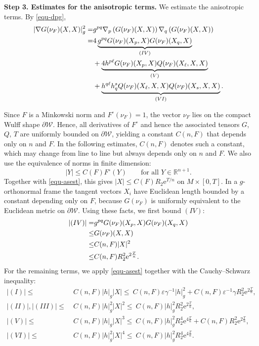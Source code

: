 \documentclass[11pt,reqno]{amsart}
\theoremstyle{definition}
\theoremstyle{remark}
\numberwithin{equation}{section}
\begin{document}
		\textbf{Step 3. Estimates for the anisotropic terms.}
		We estimate the anisotropic terms. By \eqref{equ-dpg},
		\begin{align}
			|\nabla G(\nu_F)(X,X)|_{g}^2
			=& g^{pq}\nabla_p\left( G(\nu_F)(X,X) \right) \nabla_q\left( G(\nu_F)(X,X) \right) \notag\\
			=&  4\underbrace{g^{pq}G(\nu_F)(X_p,X)G(\nu_F)(X_q,X)}_{(IV)} \nonumber\\
			&+ \underbrace{4h^{p\ell} G(\nu_F)(X_p,X) Q(\nu_F)(X_{\ell},X,X)}_{(V)} \notag\\
			& + \underbrace{h^{q\ell}h^s_q Q(\nu_F)(X_{\ell},X,X)Q(\nu_F)(X_s,X,X)}_{(VI)}.  \label{345}
		\end{align}
		
		Since $F$ is a Minkowski norm and $F^\circ(\nu_F)=1$, the vector $\nu_F$ lies on the compact Wulff shape $\partial\mathcal{W}$. Hence, all derivatives of $F^\circ$ and hence the associated tensors $G$, $Q$, $T$ are uniformly bounded on $\partial\mathcal{W}$, yielding a constant $C(n,F)$ that depends only on $n$ and $F$. In the following estimates, $C(n,F)$ denotes such a constant, which may change from line to line but always depends only on $n$ and $F$. We also use the equivalence of norms in finite dimension:
		\begin{equation*}
			|Y|\leq C(F)F^\circ(Y)\qquad\text{for all }Y\in\mathbb R^{n+1}.
		\end{equation*}
		Together with \eqref{equ-asest}, this gives $|X|\leq C(F)R_2\mathrm{e}^{T/n}$ on $M\times[0,T]$. In a $g$-orthonormal frame the tangent vectors $X_i$ have Euclidean length bounded by a constant depending only on $F$, because $G(\nu_F)$ is uniformly equivalent to the Euclidean metric on $\partial\mathcal W$. Using these facts, we first bound $(IV)$:
		\begin{align}
			\left|(IV)\right|=&g^{pq}G(\nu_F)(X_p,X)G(\nu_F)(X_q,X) \nonumber\\
			\leq& G(\nu_F)(X,X) \notag\\
			\leq& C(n,F)|X|^2 \nonumber\\
			\leq& C(n,F)R_2^2 \mathrm{e}^{2\frac{T}{n}}. \label{3est}
		\end{align}
		For the remaining terms, we apply \eqref{equ-asest} together with the Cauchy--Schwarz inequality:
		\begin{align}	\label{1245est}
				\left|(I)\right| \leq&~  C(n,F)|h|_{g}|X|
				\leq ~C(n,F)\varepsilon\gamma^{-1}|h|_{g}^2+ C(n,F)\varepsilon^{-1}\gamma R_2^2\mathrm{e}^{2\frac{T}{n}},\nonumber\\
			\left|	(II)\right|, \left|(III)\right| \leq &~C(n,F) |h|^2_{g} |X|^2 \leq ~C(n,F) |h|^2_{g} R_2^2\mathrm{e}^{2\frac{T}{n}},\nonumber\\
				\left|(V)\right| \leq &~C(n,F) |h|_{g} |X|^3 
				\leq ~C(n,F) |h|^2_{g} R_2^4\mathrm{e}^{4\frac{T}{n}} + C(n,F)R_2^2\mathrm{e}^{2\frac{T}{n}},\nonumber\\
				\left|(VI)\right| \leq &~C(n,F) |h|^2_{g} |X|^4
				\leq ~C(n,F) |h|^2_{g} R_2^4\mathrm{e}^{4\frac{T}{n}}.
		\end{align}
\end{document}
